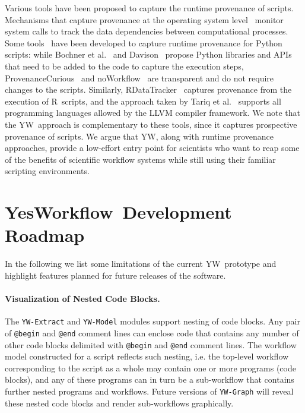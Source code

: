 \documentclass[15]{idcc}
\newcommand{\yw}{\textsf{YW}}
\newcommand{\YWT}{YesWorkflow}
\newcommand{\ywa}[1]{\texttt{\small #1}}
\newcommand{\ywm}[1]{\texttt{\small #1}}
\newcommand{\R}{R}
\begin{document}
Various tools have been proposed to capture the runtime provenance of
scripts. Mechanisms that capture provenance at the operating system
level~\cite{frew2008Automatic,guo2012BURRITO,muniswamy2006Provenance}
monitor system calls to track the data dependencies between
computational processes. Some
tools~\cite{bochner2008Python,davison2012Automated,huq2013ProvenanceCurious,murta2014noWorkflow}
have been developed to capture runtime provenance for Python scripts:
while Bochner et al.~\cite{bochner2008Python} and
Davison~\cite{davison2012Automated} propose Python libraries and APIs
that need to be added to the code to capture the execution steps,
ProvenanceCurious~\cite{huq2013ProvenanceCurious} and
noWorkflow~\cite{murta2014noWorkflow} are transparent and do not
require changes to the scripts. Similarly,
RDataTracker~\cite{Lerner2014RDataTracker} captures provenance from
the execution of \R\ scripts, and the approach taken by Tariq et
al.~\cite{Tariq2012Towards} supports all programming languages allowed
by the LLVM compiler framework. We note that the \yw\ approach is
complementary to these tools, since it captures prospective provenance
of scripts. We argue that \yw, along with runtime provenance
approaches, provide a low-effort entry point for scientists who want
to reap some of the benefits of scientific workflow systems while
still using their familiar scripting environments.


\section{\YWT\ Development Roadmap}\label{sec-conclusions}

In the following we list some limitations of the current \yw\
prototype and highlight features planned for future
releases of the software.

\paragraph{Visualization of Nested Code Blocks.}
The \ywm{YW-Extract} and \ywm{YW-Model} modules support
 nesting of code blocks. Any pair of \ywa{@begin} and \ywa{@end}
comment lines can enclose code that contains any number of other code
blocks delimited with \ywa{@begin} and \ywa{@end} comment lines.
The workflow model constructed for a script reflects such nesting, i.e.
the top-level workflow corresponding to the script as a whole may contain 
one or more programs (code blocks), and any of these programs can in turn be a 
sub-workflow that contains further nested programs and workflows.
Future versions of \ywm{YW-Graph} will reveal these nested code blocks 
and render sub-workflows graphically.
\end{document}
